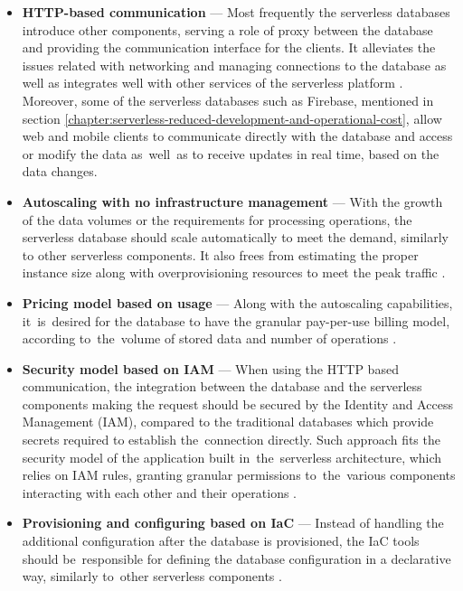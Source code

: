 \begin{itemize}
   \item \textbf{HTTP-based communication} ---
   Most frequently the serverless databases introduce other components, serving a role of proxy between the database and providing the communication interface for the clients.
   It alleviates the issues related with networking and managing connections to the database as well as integrates well with other services of the serverless platform \cite{PickingDatabaseForYourServerlessApplicationIn2021}.
   Moreover, some of the serverless databases such as Firebase, mentioned in section \ref{chapter:serverless-reduced-development-and-operational-cost}, allow web and mobile clients to communicate directly with the database and access or modify the data as~well~as to receive updates in real time, based on the data changes.
  
   \item \textbf{Autoscaling with no infrastructure management} ---
   With the growth of the data volumes or the requirements for processing operations, the serverless database should scale automatically to meet the demand, similarly to other serverless components.
   It also frees from estimating the proper instance size along with overprovisioning resources to meet the peak traffic \cite{WhatFrontEndDevelopersNeedToKnowAboutServerlessDatabases}.
  
   \item \textbf{Pricing model based on usage} ---
   Along with the autoscaling capabilities, it~is~desired for the database to have the granular pay-per-use billing model, according to~the~volume of stored data and number of operations \cite{WhatFrontEndDevelopersNeedToKnowAboutServerlessDatabases}.

   \item \textbf{Security model based on IAM} ---
   When using the HTTP based communication, the integration between the database and the serverless components making the request should be secured by the Identity and Access Management (IAM), compared to the traditional databases which provide secrets required to establish the~connection directly.
   Such approach fits the security model of the application built in~the~serverless architecture, which relies on IAM rules, granting granular permissions to~the~various components interacting with each other and their operations \cite{PickingDatabaseForYourServerlessApplicationIn2021}.

   \item \textbf{Provisioning and configuring based on IaC} ---
   Instead of handling the additional configuration after the database is provisioned, the IaC tools should be~responsible for defining the database configuration in a declarative way, similarly to~other serverless components \cite{PickingDatabaseForYourServerlessApplicationIn2021}.


\end{itemize}
